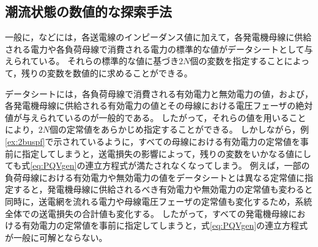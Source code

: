\documentclass[tombow,dvipdfmx]{corona-a5-1.1}
\begin{document}




\subsection{潮流状態の数値的な探索手法}


一般に，などには，各送電線のインピーダンス値に加えて，各発電機母線に供給される電力や各負荷母線で消費される電力の標準的な値がデータシートとして与えられている。
それらの標準的な値に基づき$2N$個の変数を指定することによって，残りの変数を数値的に求めることができる。


データシートには，各負荷母線で消費される有効電力と無効電力の値，および，各発電機母線に供給される有効電力の値とその母線における電圧フェーザの絶対値が与えられているのが一般的である。
したがって，それらの値を用いることにより，$2N$個の定常値をあらかじめ指定することができる。
しかしながら，例\ref{ex:2buspf}で示されているように，すべての母線における有効電力の定常値を事前に指定してしまうと，送電損失の影響によって，残りの変数をいかなる値にしても式\ref{eq:PQVgen}の連立方程式が満たされなくなってしまう。
例えば，一部の負荷母線における有効電力や無効電力の値をデータシートとは異なる定常値に指定すると，発電機母線に供給されるべき有効電力や無効電力の定常値も変わると同時に，送電網を流れる電力や母線電圧フェーザの定常値も変化するため，系統全体での送電損失の合計値も変化する。
したがって，すべての発電機母線における有効電力の定常値を事前に指定してしまうと，式\ref{eq:PQVgen}の連立方程式が一般に可解とならない。
\end{document}

